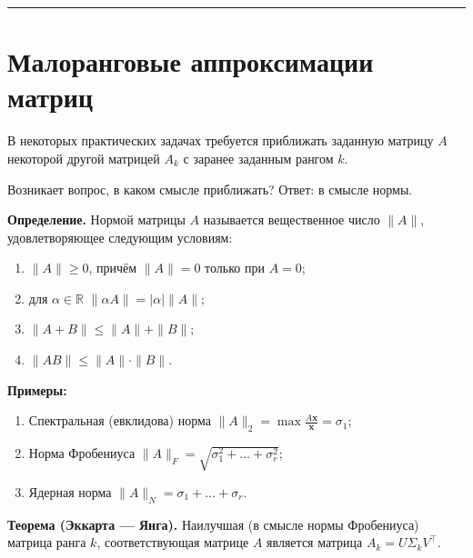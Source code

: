 \documentclass[11pt,a4paper]{article}
\renewcommand{\linethickness}{0.1ex}
\providecommand{\tightlist}{%
      \setlength{\itemsep}{0pt}\setlength{\parskip}{0pt}}
\begin{document}
    \begin{center}\rule{0.5\linewidth}{\linethickness}\end{center}

    \hypertarget{ux43cux430ux43bux43eux440ux430ux43dux433ux43eux432ux44bux435-ux430ux43fux43fux440ux43eux43aux441ux438ux43cux430ux446ux438ux438-ux43cux430ux442ux440ux438ux446}{%
\section{Малоранговые аппроксимации
матриц}\label{ux43cux430ux43bux43eux440ux430ux43dux433ux43eux432ux44bux435-ux430ux43fux43fux440ux43eux43aux441ux438ux43cux430ux446ux438ux438-ux43cux430ux442ux440ux438ux446}}

В некоторых практических задачах требуется приближать заданную матрицу
\(A\) некоторой другой матрицей \(A_k\) с заранее заданным рангом \(k\).

Возникает вопрос, в каком смысле приближать? Ответ: в смысле нормы.

\textbf{Определение.} Нормой матрицы \(A\) называется вещественное число
\(\|A\|\), удовлетворяющее следующим условиям:

\begin{enumerate}
\def\labelenumi{\arabic{enumi}.}
\tightlist
\item
  \(\|A\| \ge 0\), причём \(\|A\| = 0\) только при \(A = 0\);
\item
  для \(\alpha \in \mathbb{R}\) \(\|\alpha A\| = |\alpha| \|A\|\);
\item
  \(\|A + B\| \le \|A\| + \|B\|\);
\item
  \(\|A B\| \le \|A\| \cdot \|B\|\).
\end{enumerate}

\textbf{Примеры:}

\begin{enumerate}
\def\labelenumi{\arabic{enumi}.}
\item
  Спектральная (евклидова) норма
  \(\|A\|_2 = \max \frac{A \mathbf{x}}{\mathbf{x}} = \sigma_1\);
\item
  Норма Фробениуса
  \(\|A\|_F = \sqrt{\sigma_1^2 + \ldots + \sigma_r^2}\);
\item
  Ядерная норма \(\|A\|_N = \sigma_1 + \ldots + \sigma_r\).
\end{enumerate}

\textbf{Теорема (Эккарта --- Янга).} Наилучшая (в смысле нормы
Фробениуса) матрица ранга \(k\), соответствующая матрице \(A\) является
матрица \(A_k = U \Sigma_k V^\top\).
\end{document}
